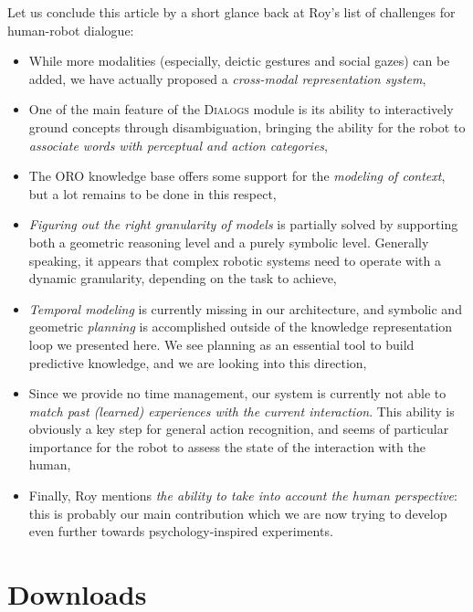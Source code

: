 \documentclass[twocolumn]{svjour3}
\begin{document}
Let us conclude this article by a short glance back at Roy's list of challenges
for human-robot dialogue: 
\begin{itemize}

	\item While more modalities (especially, deictic gestures and social gazes)
	can be added, we have actually proposed a \emph{cross-modal
	representation system},

	\item One of the main feature of the \textsc{Dialogs} module is its ability
	to interactively ground concepts through disambiguation, bringing the
	ability for the robot to \emph{associate words with perceptual and action
	categories},

	\item The ORO knowledge base offers some support for the \emph{modeling of
	context}, but a lot remains to be done in this respect,

	\item \emph{Figuring out the right granularity of models} is partially
	solved by supporting both a geometric reasoning level and a purely symbolic
	level. Generally speaking, it appears that complex robotic systems need
	to operate with a dynamic granularity, depending on the task to achieve,

	\item \emph{Temporal modeling} is currently missing in our architecture,
	and symbolic and geometric \emph{planning} is accomplished outside of the
	knowledge representation loop we presented here. We see planning as an
	essential tool to build predictive knowledge, and we are looking into this
	direction,

	\item Since we provide no time management, our system is currently not able
	to \emph{match past (learned) experiences with the current interaction}.
	This ability is obviously a key step for general action recognition, and
	seems of particular importance for the robot to assess the state of the
	interaction with the human,

	\item Finally, Roy mentions \emph{the ability to take into account the
	human perspective}: this is probably our main contribution which we are now
	trying to develop even further towards psychology-inspired experiments.

\end{itemize}
\section{Downloads} 
\end{document}
